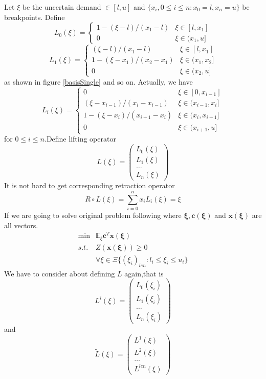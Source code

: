 \documentclass{article}
\begin{document}
Let $\xi$ be the uncertain demand $\in [l,u]$ and $\{x_{i},0 \leq i \leq n:x_0 =l,x_n= u\}$ be breakpoints. Define
$$
L_0(\xi) = \left\{
\begin{array}{ll}
1-(\xi-l)/(x_1-l) & \xi \in [l,x_1]\\
0 & \xi \in (x_1,u]
\end{array}
\right.
$$
$$
L_1(\xi) = \left\{
\begin{array}{ll}
(\xi-l)/(x_1-l) & \xi \in [l,x_1]\\
1-(\xi-x_1)/(x_2-x_1) & \xi \in (x_1,x_2]\\
0 & \xi \in (x_2,u]
\end{array}
\right.
$$
 as shown in figure \ref{basisSingle} and so on. Actually, we have
$$
L_i(\xi) = \left\{
\begin{array}{ll}
0 & \xi\in[0,x_{i-1}]\\
(\xi-x_{i-1})/(x_i-x_{i-1}) & \xi \in (x_{i-1},x_i]\\
1-(\xi-x_i)/(x_{i+1}-x_i) & \xi \in (x_i,x_{i+1}]\\
0 & \xi \in (x_{i+1},u]
\end{array}
\right.
$$
for $0\leq i \leq n$.Define lifting operator
$$
L(\xi) =
\left(
\begin{array}{c}
L_0(\xi)\\
L_1(\xi)\\
\ldots\\
L_n(\xi)
\end{array}
\right)
$$
It is not hard to get corresponding retraction operator
$$
R\circ L (\xi) = \sum\limits_{i=0}^n x_i L_i(\xi) = \xi
$$
If we are going to solve original problem following where $\mathbf{\xi},\mathbf{c(\xi)}$ and $\mathbf{x(\xi)}$ are all vectors.
$$
\begin{array}{ll}
\min & \mathbb{E_\xi}\mathbf{c}^T \mathbf{x(\xi)}\\
s.t. & Z(\mathbf{x(\xi)}) \geq 0 \\
& \forall \xi \in \Xi \{(\xi_i)_{len}:l_i \leq \xi_i \leq u_i \}
\end{array}
$$
We have to consider about defining $L$ again,that is
$$L^i(\xi) =
\left(
\begin{array}{c}
L_0(\xi_i)\\
L_1(\xi_i)\\
\ldots\\
L_n(\xi_i)
\end{array}
\right)$$
and
$$
\tilde{L}(\xi) =
\left(
\begin{array}{c}
L^1(\xi)\\
L^2(\xi)\\
\ldots\\
L^{len}(\xi)
\end{array}
\right)
$$
\end{document}
